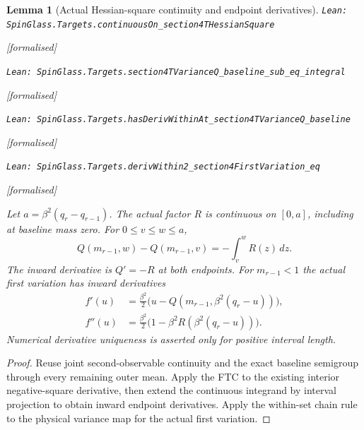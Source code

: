 \documentclass[11pt]{article}
\providecommand{\lean}[1]{\leavevmode\par\nopagebreak
  {\noindent\normalfont\footnotesize\raggedright\texttt{Lean: #1}\par}\nopagebreak}
\providecommand{\leanok}{\par\nopagebreak
  {\noindent\normalfont\footnotesize\textcolor{green!50!black}{[formalised]}\par}\nopagebreak}
\newtheorem{lemma}[theorem]{Lemma}
\begin{document}
\begin{lemma}[Actual Hessian-square continuity and endpoint derivatives]
\lean{SpinGlass.Targets.continuousOn\_section4THessianSquare}\leanok
\lean{SpinGlass.Targets.section4TVarianceQ\_baseline\_sub\_eq\_integral}\leanok
\lean{SpinGlass.Targets.hasDerivWithinAt\_section4TVarianceQ\_baseline}\leanok
\lean{SpinGlass.Targets.derivWithin2\_section4FirstVariation\_eq}\leanok
Let $a=\beta^2(q_r-q_{r-1})$. The actual factor $R$ is continuous on $[0,a]$,
including at baseline mass zero. For $0\le v\le w\le a$,
\[
 Q(m_{r-1},w)-Q(m_{r-1},v)=-\int_v^w R(z)\,dz .
\]
The inward derivative is $Q'=-R$ at both endpoints. For $m_{r-1}<1$ the
actual first variation has inward derivatives
\[
 \begin{aligned}
 f'(u)&=\frac{\beta^2}{2}\bigl(u-Q(m_{r-1},\beta^2(q_r-u))\bigr),\\
 f''(u)&=\frac{\beta^2}{2}\bigl(1-\beta^2R(\beta^2(q_r-u))\bigr).
 \end{aligned}
\]
Numerical derivative uniqueness is asserted only for positive interval length.
\end{lemma}
\begin{proof}
Reuse joint second-observable continuity and the exact baseline semigroup
through every remaining outer mean. Apply the FTC to the existing interior
negative-square derivative, then extend the continuous integrand by interval
projection to obtain inward endpoint derivatives. Apply the within-set chain
rule to the physical variance map for the actual first variation.
\end{proof}
\end{document}
